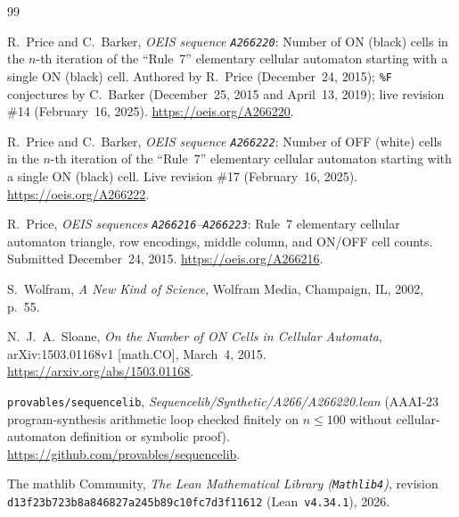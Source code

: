 \documentclass[11pt]{article}
\theoremstyle{definition}
\newcommand{\seq}[1]{\texttt{#1}}
\begin{document}
\begin{thebibliography}{99}
\raggedright

R.\ Price and C.\ Barker, \emph{OEIS sequence \seq{A266220}}: Number of ON (black) cells in the $n$-th iteration of the ``Rule~7'' elementary cellular automaton starting with a single ON (black) cell. Authored by R.\ Price (December~24, 2015); \texttt{\%F} conjectures by C.\ Barker (December~25, 2015 and April~13, 2019); live revision \#14 (February~16, 2025). \url{https://oeis.org/A266220}.

R.\ Price and C.\ Barker, \emph{OEIS sequence \seq{A266222}}: Number of OFF (white) cells in the $n$-th iteration of the ``Rule~7'' elementary cellular automaton starting with a single ON (black) cell. Live revision \#17 (February~16, 2025). \url{https://oeis.org/A266222}.

R.\ Price, \emph{OEIS sequences \seq{A266216}--\seq{A266223}}: Rule~7 elementary cellular automaton triangle, row encodings, middle column, and ON/OFF cell counts. Submitted December~24, 2015. \url{https://oeis.org/A266216}.

S.\ Wolfram, \emph{A New Kind of Science}, Wolfram Media, Champaign, IL, 2002, p.~55.

N.~J.~A.\ Sloane, \emph{On the Number of ON Cells in Cellular Automata}, arXiv:1503.01168v1 [math.CO], March~4, 2015. \url{https://arxiv.org/abs/1503.01168}.

\texttt{provables/sequencelib}, \emph{Sequencelib/Synthetic/A266/A266220.lean} (AAAI-23 program-synthesis arithmetic loop checked finitely on $n \le 100$ without cellular-automaton definition or symbolic proof). \url{https://github.com/provables/sequencelib}.

The mathlib Community, \emph{The Lean Mathematical Library (\texttt{Mathlib4})}, revision \texttt{d13f23b723b8a846827a245b89c10fc7d3f11612} (Lean~\texttt{v4.34.1}), 2026.

\end{thebibliography}
\end{document}
